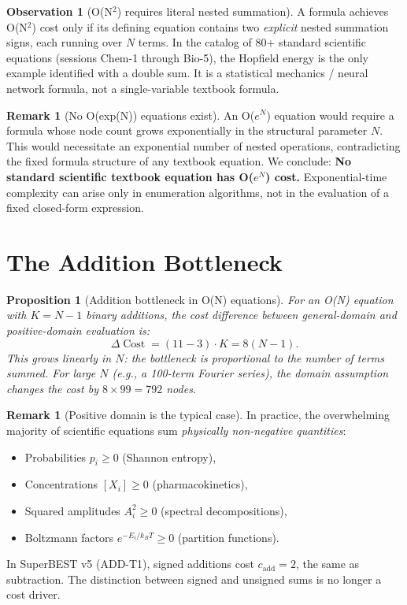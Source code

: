 \documentclass[12pt,a4paper]{article}
\newtheorem{proposition}[theorem]{Proposition}
\theoremstyle{definition}
\newtheorem{remark}[theorem]{Remark}
\newtheorem{observation}[theorem]{Observation}
\newcommand{\Cost}{\operatorname{Cost}}
\begin{document}
\begin{observation}[O(N$^2$) requires literal nested summation]
\label{obs:ON2_condition}
A formula achieves O(N$^2$) cost only if its defining equation contains
two \emph{explicit} nested summation signs, each running over $N$ terms.
In the catalog of 80+ standard scientific equations (sessions Chem-1
through Bio-5), the Hopfield energy is the only example identified with
a double sum.  It is a statistical mechanics / neural network formula,
not a single-variable textbook formula.
\end{observation}

\begin{remark}[No O(exp(N)) equations exist]
An O($e^N$) equation would require a formula whose node count grows
exponentially in the structural parameter $N$.  This would necessitate
an exponential number of nested operations, contradicting the fixed
formula structure of any textbook equation.  We conclude:
\textbf{No standard scientific textbook equation has O($e^N$) cost.}
Exponential-time complexity can arise only in enumeration algorithms,
not in the evaluation of a fixed closed-form expression.
\end{remark}

\section{The Addition Bottleneck}
\label{sec:add_bottleneck}

\begin{proposition}[Addition bottleneck in O(N) equations]
\label{prop:add_bottleneck}
For an O(N) equation with $K = N-1$ binary additions, the cost
difference between general-domain and positive-domain evaluation is:
\[
  \Delta\Cost = (11 - 3) \cdot K = 8(N-1).
\]
This grows linearly in $N$: the bottleneck is proportional to the
number of terms summed.  For large $N$ (e.g., a 100-term Fourier
series), the domain assumption changes the cost by $8 \times 99 = 792$
nodes.
\end{proposition}

\begin{remark}[Positive domain is the typical case]
In practice, the overwhelming majority of scientific equations sum
\emph{physically non-negative quantities}:
\begin{itemize}
  \item Probabilities $p_i \geq 0$ (Shannon entropy),
  \item Concentrations $[X_i] \geq 0$ (pharmacokinetics),
  \item Squared amplitudes $A_i^2 \geq 0$ (spectral decompositions),
  \item Boltzmann factors $e^{-E_i/k_BT} \geq 0$ (partition functions).
\end{itemize}
In SuperBEST v5 (ADD-T1), signed additions cost $c_{\mathrm{add}} = 2$,
the same as subtraction.  The distinction between signed and unsigned
sums is no longer a cost driver.
\end{remark}
\end{document}
